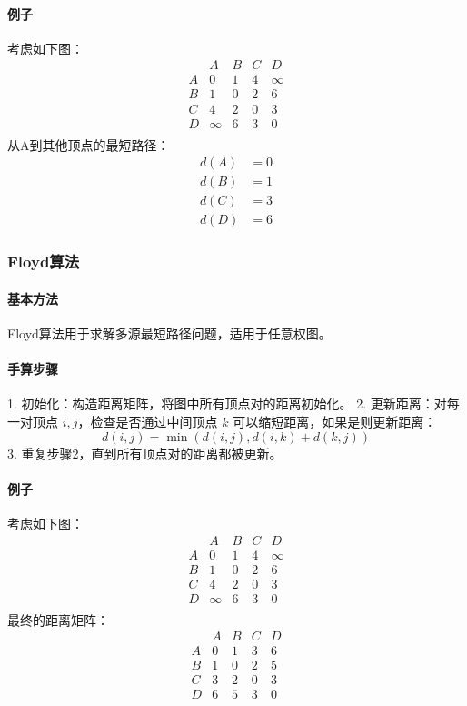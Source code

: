 \documentclass[UTF8]{ctexart}
\begin{document}
\paragraph{例子}
考虑如下图：
\[
\begin{array}{c|cccc}
 & A & B & C & D \\
\hline
A & 0 & 1 & 4 & \infty \\
B & 1 & 0 & 2 & 6 \\
C & 4 & 2 & 0 & 3 \\
D & \infty & 6 & 3 & 0 \\
\end{array}
\]
从A到其他顶点的最短路径：
\[
\begin{aligned}
d(A) & = 0 \\
d(B) & = 1 \\
d(C) & = 3 \\
d(D) & = 6
\end{aligned}
\]

\subsubsection{Floyd算法}
\paragraph{基本方法}
Floyd算法用于求解多源最短路径问题，适用于任意权图。
\paragraph{手算步骤}
1. 初始化：构造距离矩阵，将图中所有顶点对的距离初始化。
2. 更新距离：对每一对顶点 \(i, j\)，检查是否通过中间顶点 \(k\) 可以缩短距离，如果是则更新距离：
\[
d(i, j) = \min(d(i, j), d(i, k) + d(k, j))
\]
3. 重复步骤2，直到所有顶点对的距离都被更新。

\paragraph{例子}
考虑如下图：
\[
\begin{array}{c|cccc}
 & A & B & C & D \\
\hline
A & 0 & 1 & 4 & \infty \\
B & 1 & 0 & 2 & 6 \\
C & 4 & 2 & 0 & 3 \\
D & \infty & 6 & 3 & 0 \\
\end{array}
\]
最终的距离矩阵：
\[
\begin{array}{c|cccc}
 & A & B & C & D \\
\hline
A & 0 & 1 & 3 & 6 \\
B & 1 & 0 & 2 & 5 \\
C & 3 & 2 & 0 & 3 \\
D & 6 & 5 & 3 & 0 \\
\end{array}
\]
\end{document}
